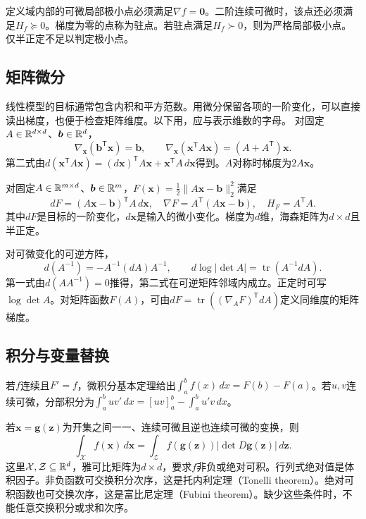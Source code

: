 定义域内部的可微局部极小点必须满足$\nabla f=\bm0$。二阶连续可微时，该点还必须满足$H_f\succeq0$。梯度为零的点称为驻点。若驻点满足$H_f\succ0$，则为严格局部极小点。仅半正定不足以判定极小点。

\subsection{矩阵微分}
线性模型的目标通常包含内积和平方范数。用微分保留各项的一阶变化，可以直接读出梯度，也便于检查矩阵维度。以下用，应与表示维数的字母。
对固定$A\in\mathbb{R}^{d\times d}$、$\bm b\in\mathbb{R}^d$，
\begin{equation}
 \nabla_{\bm x}(\bm b^{\mathsf T}\bm x)=\bm b,\qquad
 \nabla_{\bm x}(\bm x^{\mathsf T}A\bm x)=(A+A^{\mathsf T})\bm x.
\end{equation}
第二式由$d(\bm x^{\mathsf T}A\bm x)=(d\bm x)^{\mathsf T}A\bm x+\bm x^{\mathsf T}A\,d\bm x$得到。$A$对称时梯度为$2A\bm x$。

对固定$A\in\mathbb{R}^{m\times d}$、$\bm b\in\mathbb{R}^m$，$F(\bm x)=\tfrac12\|A\bm x-\bm b\|_2^2$满足
\begin{equation}
 dF=(A\bm x-\bm b)^{\mathsf T}A\,d\bm x,\quad
 \nabla F=A^{\mathsf T}(A\bm x-\bm b),\quad H_F=A^{\mathsf T}A.
\end{equation}
其中$dF$是目标的一阶变化，$d\bm x$是输入的微小变化。梯度为$d$维，海森矩阵为$d\times d$且半正定。

对可微变化的可逆方阵，
\begin{equation}
 d(A^{-1})=-A^{-1}(dA)A^{-1},\qquad
 d\log|\det A|=\operatorname{tr}(A^{-1}dA).
\end{equation}
第一式由$d(AA^{-1})=0$推得，第二式在可逆矩阵邻域内成立。正定时可写$\log\det A$。对矩阵函数$F(A)$，可由$dF=\operatorname{tr}((\nabla_A F)^{\mathsf T}dA)$定义同维度的矩阵梯度。

\subsection{积分与变量替换}
若$f$连续且$F'=f$，微积分基本定理给出$\int_a^b f(x)\,dx=F(b)-F(a)$。若$u,v$连续可微，分部积分为$\int_a^b uv'\,dx=[uv]_a^b-\int_a^b u'v\,dx$。

若$\bm x=\bm g(\bm z)$为开集之间一一、连续可微且逆也连续可微的变换，则
\begin{equation}
 \int_{\mathcal X}f(\bm x)\,d\bm x
 =\int_{\mathcal Z}f(\bm g(\bm z))|\det D\bm g(\bm z)|\,d\bm z.
\end{equation}
这里$\mathcal X,\mathcal Z\subseteq\mathbb{R}^d$，雅可比矩阵为$d\times d$，要求$f$非负或绝对可积。行列式绝对值是体积因子。非负函数可交换积分次序，这是托内利定理（Tonelli theorem）。绝对可积函数也可交换次序，这是富比尼定理（Fubini theorem）。缺少这些条件时，不能任意交换积分或求和次序。

